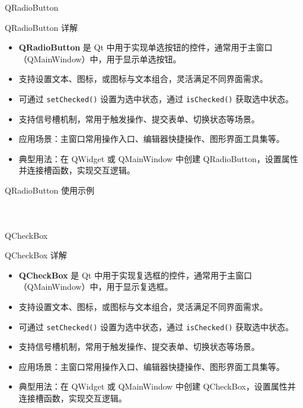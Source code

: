 \documentclass[UTF8,aspectratio=169]{beamer}
\begin{document}
\begin{frame}{QRadioButton}
    \begin{ytublock}{QRadioButton 详解}
        \begin{itemize}
            \item \textbf{QRadioButton} 是 Qt 中用于实现单选按钮的控件，通常用于主窗口（QMainWindow）中，用于显示单选按钮。
            \item 支持设置文本、图标，或图标与文本组合，灵活满足不同界面需求。
            \item 可通过 \texttt{setChecked()} 设置为选中状态，通过 \texttt{isChecked()} 获取选中状态。
            \item 支持信号槽机制，常用于触发操作、提交表单、切换状态等场景。
            \item 应用场景：主窗口常用操作入口、编辑器快捷操作、图形界面工具集等。
            \item 典型用法：在 QWidget 或 QMainWindow 中创建 QRadioButton，设置属性并连接槽函数，实现交互逻辑。
        \end{itemize}
    \end{ytublock}
\end{frame}

\begin{frame}[fragile]{QRadioButton 使用示例}
    \begin{columns}
        \begin{column}{0.48\textwidth}
            \inputminted[firstline=1,lastline=19]{cpp}{code/qt_radiobutton_example.cpp}
        \end{column}
        \begin{column}{0.48\textwidth}
            \inputminted[firstline=20,lastline=38]{cpp}{code/qt_radiobutton_example.cpp}
        \end{column}
    \end{columns}
\end{frame}

\begin{frame}{QCheckBox}
    \begin{ytublock}{QCheckBox 详解}
        \begin{itemize}
            \item \textbf{QCheckBox} 是 Qt 中用于实现复选框的控件，通常用于主窗口（QMainWindow）中，用于显示复选框。
            \item 支持设置文本、图标，或图标与文本组合，灵活满足不同界面需求。
            \item 可通过 \texttt{setChecked()} 设置为选中状态，通过 \texttt{isChecked()} 获取选中状态。
            \item 支持信号槽机制，常用于触发操作、提交表单、切换状态等场景。
            \item 应用场景：主窗口常用操作入口、编辑器快捷操作、图形界面工具集等。
            \item 典型用法：在 QWidget 或 QMainWindow 中创建 QCheckBox，设置属性并连接槽函数，实现交互逻辑。
        \end{itemize}
    \end{ytublock}
\end{frame}
\end{document}
